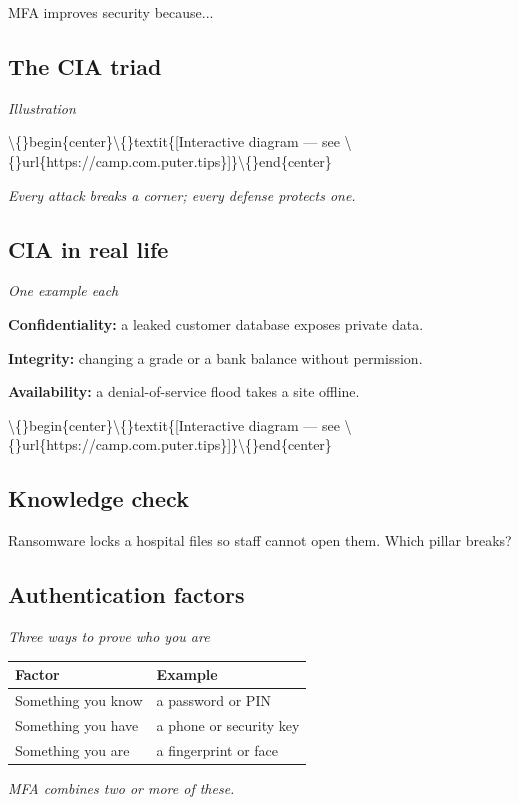 \documentclass[12pt,openany]{book}
\begin{document}
MFA improves security because...

\medskip

\subsection*{The CIA triad}
{\small\itshape\color{gray}Illustration}

\textbackslash\{\}begin\{center\}\textbackslash\{\}textit\{[Interactive diagram --- see \textbackslash\{\}url\{https://camp.com.puter.tips\}]\}\textbackslash\{\}end\{center\}

{\small\itshape\color{gray}Every attack breaks a corner; every defense protects one.}

\medskip

\subsection*{CIA in real life}
{\small\itshape\color{gray}One example each}


\textbf{Confidentiality:} a leaked customer database exposes private data.

\textbf{Integrity:} changing a grade or a bank balance without permission.

\textbf{Availability:} a denial-of-service flood takes a site offline.


\textbackslash\{\}begin\{center\}\textbackslash\{\}textit\{[Interactive diagram --- see \textbackslash\{\}url\{https://camp.com.puter.tips\}]\}\textbackslash\{\}end\{center\}

\medskip

\subsection*{Knowledge check}

Ransomware locks a hospital files so staff cannot open them. Which pillar breaks?

\medskip

\subsection*{Authentication factors}
{\small\itshape\color{gray}Three ways to prove who you are}


\begin{center}\small\begin{tabular}{p{6.5cm}p{6.5cm}}\toprule
\textbf{Factor} & \textbf{Example} \\ \midrule
Something you know & a password or PIN \\
Something you have & a phone or security key \\
Something you are & a fingerprint or face \\
\bottomrule\end{tabular}\end{center}
{\small\itshape\color{gray}MFA combines two or more of these.}
\end{document}
